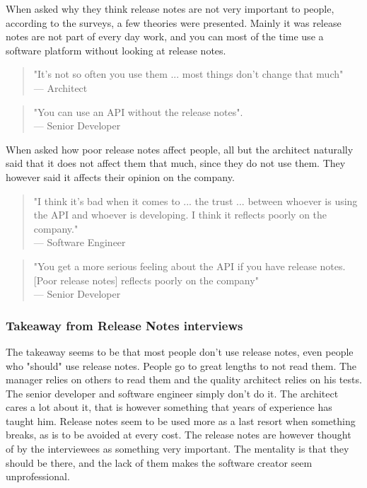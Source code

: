 \documentclass{cslthse-msc}
\begin{document}
    When asked why they think release notes are not very important to people, according to the surveys, a few theories were presented. Mainly it was release notes are not part of every day work, and you can most of the time use a software platform without looking at release notes.
    \begin{quote}
        "It's not so often you use them ... most things don't change that much" \\
        --- Architect
    \end{quote}
    \begin{quote}
        "You can use an API without the release notes".\\
        --- Senior Developer
    \end{quote}
    When asked how poor release notes affect people, all but the architect naturally said that it does not affect them that much, since they do not use them. They however said it affects their opinion on the company.
    \begin{quote}
        "I think it's bad when it comes to ... the trust ... between whoever is using the API and whoever is developing. I think it reflects poorly on the company."\\
        --- Software Engineer
    \end{quote}
    \begin{quote}
        "You get a more serious feeling about the API if you have release notes. [Poor release notes] reflects poorly on the company"\\
        --- Senior Developer
    \end{quote}
    \subsubsection{Takeaway from Release Notes interviews}
    The takeaway seems to be that most people don't use release notes, even people who "should" use release notes. People go to great lengths to not read them. The manager relies on others to read them and the quality architect relies on his tests. The senior developer and software engineer simply don't do it. The architect cares a lot about it, that is however something that years of experience has taught him. Release notes seem to be used more as a last resort when something breaks, as is to be avoided at every cost. The release notes are however thought of by the interviewees as something very important. The mentality is that they should be there, and the lack of them makes the software creator seem unprofessional.
\end{document}
